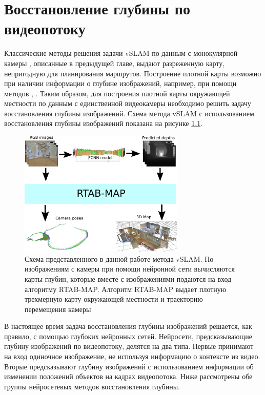 \documentclass{mipt-thesis-ms}
\begin{document}
	
	\chapter{Восстановление глубины по видеопотоку}
	
	Классические методы решения задачи vSLAM по данным с монокулярной камеры \cite{mur2015orb} \cite{engel2014lsd}, описанные в предыдущей главе, выдают разреженную карту, непригодную для планирования маршрутов. Построение плотной карты возможно при наличии информации о глубине изображений, например, при помощи методов \cite{labbe2011memory}, \cite{endres20133}. Таким образом, для построения плотной карты окружающей местности по данным с единственной видеокамеры необходимо решить задачу восстановления глубины изображений. Схема метода vSLAM с использованием восстановления глубины изображений показана на рисунке \ref{figure_our_slam_pipeline}.
	
	\begin{figure}
		\centering
		\includegraphics[width=0.7\textwidth]{img/slam_scheme.png}
		\caption{Схема представленного в данной работе метода vSLAM. По изображениям с камеры при помощи нейронной сети вычисляются карты глубин, которые вместе с изображениями подаются на вход алгоритму RTAB-MAP. Алгоритм RTAB-MAP выдает плотную трехмерную карту окружающей местности и траекторию перемещения камеры}
		\label{figure_our_slam_pipeline}
	\end{figure}
	
	В настоящее время задача восстановления глубины изображений решается, как правило, с помощью глубоких нейронных сетей. Нейросети, предсказывающие глубину изображений по видеопотоку, делятся на два типа. Первые принимают на вход одиночное изображение, не используя информацию о контексте из видео. Вторые предсказывают глубину изображений с использованием информации об изменении положений объектов на кадрах видеопотока. Ниже рассмотрены обе группы нейросетевых методов восстановления глубины.
	
\end{document}

